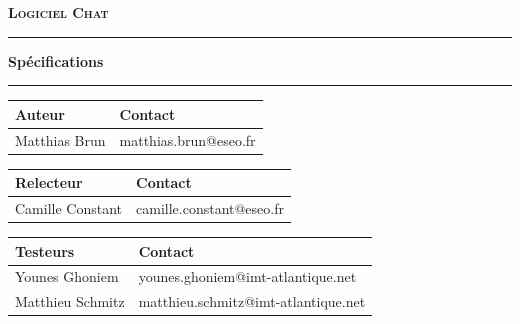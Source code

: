 \documentclass[a4paper,11pt,titlepage]{article}
\begin{document}
\sloppy%

\vspace{-2cm}%
\begin{center}%

\vspace{0.2cm}
{\Large {\textsc{\bf Logiciel \og Chat \fg}}}

\rule[0.5ex]{0.52\textwidth}{0.1mm}

\vspace{0.2cm}
{\Large\bf{Spécifications}}

\rule[0.5ex]{0.52\textwidth}{0.1mm}
\end{center}

\vspace{1cm}
\begin{tabular}{|p{5cm}|p{9cm}|}
\hline
\textbf{Auteur} & \textbf{Contact} \\
\hline
Matthias Brun & matthias.brun@eseo.fr\\
\hline
\end{tabular}

\vspace{0.5cm}
\begin{tabular}{|p{5cm}|p{9cm}|}
\hline
\textbf{Relecteur} & \textbf{Contact} \\
\hline
Camille Constant & camille.constant@eseo.fr\\
\hline
\end{tabular}

\vspace{0.5cm}
\begin{tabular}{|p{5cm}|p{9cm}|}
	\hline
	\textbf{Testeurs} & \textbf{Contact} \\
	\hline
	Younes Ghoniem & younes.ghoniem@imt-atlantique.net\\
	\hline
	Matthieu Schmitz & matthieu.schmitz@imt-atlantique.net\\
	\hline
\end{tabular}
\end{document}
